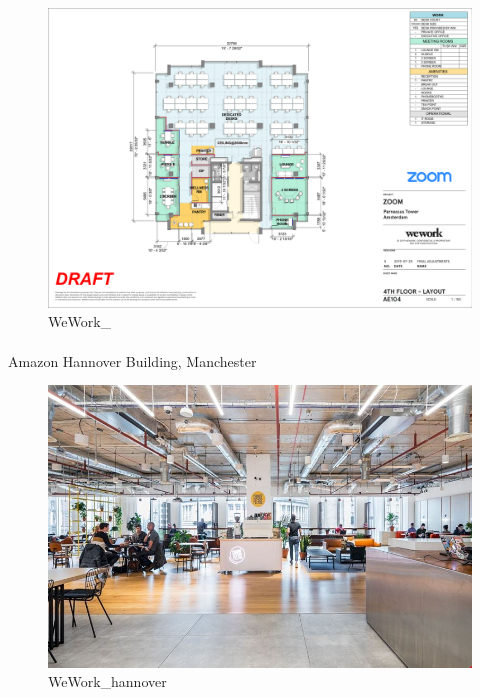 \documentclass[
]{article}
\makeatletter
\let\oldparagraph\paragraph
\renewcommand{\paragraph}{
    \@ifstar
      \xxxParagraphStar
      \xxxParagraphNoStar
  }
\newcommand{\xxxParagraphStar}[1]{\oldparagraph*{#1}\mbox{}}
\newcommand{\xxxParagraphNoStar}[1]{\oldparagraph{#1}\mbox{}}
\makeatother
\begin{document}
\begin{figure}[H]

{\centering \includegraphics{assets/WeWork/ww-parnassus-4.png}

}

\caption{WeWork\_}

\end{figure}%

\paragraph{Amazon Hannover Building,
Manchester}\label{amazon-hannover-building-manchester}

\begin{figure}[H]

{\centering \includegraphics{assets/WeWork/WW_hannover.jpg}

}

\caption{WeWork\_hannover}

\end{figure}%
\end{document}
